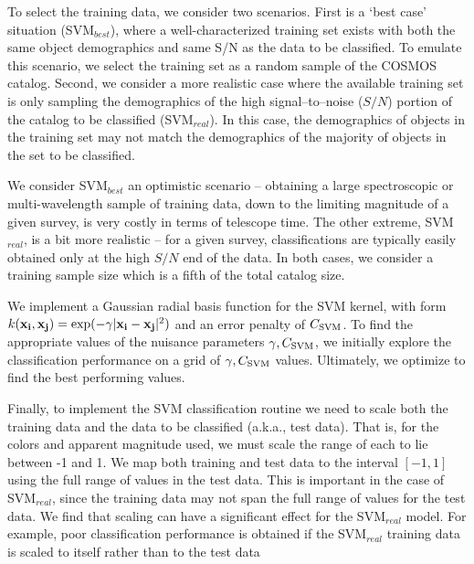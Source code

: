\documentclass[12pt,preprint]{aastex}
\begin{document}
To select the training data, we consider two scenarios.  First is a
`best case' situation (SVM$_{best}$), where a well-characterized
training set exists with both the same object demographics and same
S/N as the data to be classified.  To emulate this scenario, we select
the training set as a random sample of the COSMOS catalog.  Second, we
consider a more realistic case where the available training set is
only sampling the demographics of the high signal--to--noise ($S/N$)
portion of the catalog to be classified (SVM$_{real}$).  In this
case, the demographics of objects in the training set may not match
the demographics of the majority of objects in the set to be
classified.

We consider SVM$_{best}$ an optimistic scenario -- obtaining a large
spectroscopic or multi-wavelength sample of training data, down to the
limiting magnitude of a given survey, is very costly in terms of
telescope time.  The other extreme, SVM$_{real}$, is a bit more
realistic -- for a given survey, classifications are typically easily
obtained only at the high $S/N$ end of the data.  In both cases, we
consider a training sample size which is a fifth of the total catalog
size.

We implement a Gaussian radial basis function for the SVM kernel, with
form $k(\mathbf{x_i},\mathbf{x_j}) = {\rm
  exp}(-\gamma|\mathbf{x_i}-\mathbf{x_j}|^2)$ and an error penalty of
$C_{\rm SVM}$.  To find the appropriate values of the nuisance
parameters $\gamma,C_{\rm SVM}$, we initially explore the
classification performance on a grid of $\gamma,C_{\rm SVM}$ values.
Ultimately, we optimize to find the best performing values.

Finally, to implement the SVM classification routine we need to scale both 
the training data and the data to be classified (a.k.a., test data).  That is, for 
the colors and apparent magnitude used, we must scale the range of each to lie 
between -1 and 1.  We map both training and test data to the interval $[-1,1]$ 
using the full range of values in the test data.  This is important in the case 
of SVM$_{real}$, since the training data may not span the full range 
of values for the test data.  We find that scaling can have a significant 
effect for the SVM$_{real}$ model.  For example, poor classification performance is 
obtained if the SVM$_{real}$ training data is scaled to itself rather than to the test data

\end{document}
